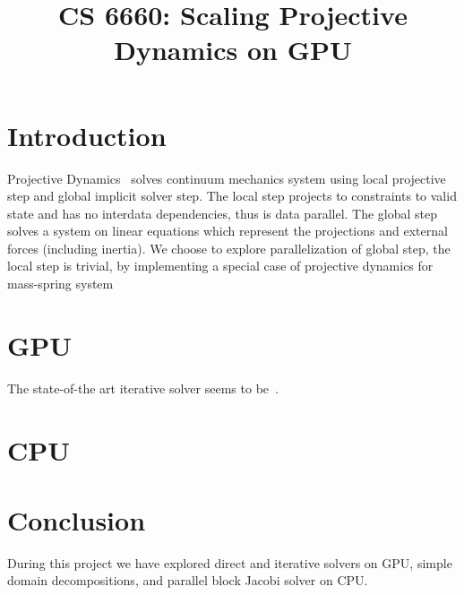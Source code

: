 \documentclass{article}
\title{CS 6660: Scaling Projective Dynamics on GPU}
\begin{document}
\maketitle

\section{Introduction}
Projective Dynamics~\cite{Bouaziz14} solves continuum mechanics system using
local projective step and global implicit solver step. The local step projects
to constraints to valid state and has no interdata dependencies, thus is data
parallel. The global step solves a system on linear equations which represent
the projections and external forces (including inertia). We choose to explore
parallelization of global step, the local step is trivial, by implementing
a special case of projective dynamics for mass-spring system~\cite{Liu13}


\section{GPU}

The state-of-the art iterative solver seems to be~\cite{Wang15}.



\section{CPU}


\section{Conclusion}
During this project we have explored direct and iterative solvers on GPU,
simple domain decompositions, and parallel block Jacobi solver on CPU.



{}

\end{document}
